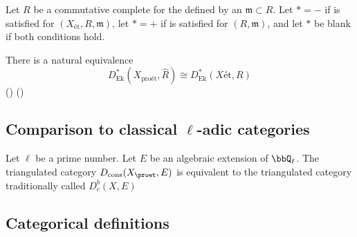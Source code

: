 \begin{proposition} \label{comparison_of_ekedahls_category_on_etale_site_of_schemes_with_proetale_version}
    Let $R$ be a commutative  complete for the  defined by an  $\mathfrak{m} \subset R$. Let $* = -$ if  is satisfied for $(X_{\text{\'et}}, R, \mathfrak{m})$, let $* = +$ if  is satisfied for $(R,\mathfrak{m})$, and let $*$ be blank if both conditions hold. 

    There is a natural equivalence
    $$D_{\text{Ek}}^*(X_{\text{pro\'et}}, \widehat{R}) \cong D_{\text{Ek}}^*(X{\text{\'et}}, R)$$
    () ()


\end{proposition}


\subsection{Comparison to classical $\ell$-adic categories}

\begin{theorem}
    Let $\ell$ be a prime number. Let $E$ be an algebraic extension of $\bbQ_\ell$. The triangulated category $D_{\mathrm{cons}}(X_{\proet}, E)$ is equivalent to the triangulated category traditionally called $D_c^b(X,E)$
\end{theorem}


\appendix

\subsection{Categorical definitions}








